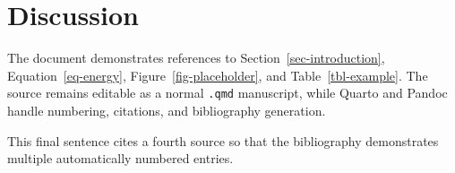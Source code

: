 \documentclass[
  number,
  preprint]{elsarticle}
\begin{document}
\section{Discussion}\label{sec-discussion}

The document demonstrates references to Section~\ref{sec-introduction},
Equation~\ref{eq-energy}, Figure~\ref{fig-placeholder}, and
Table~\ref{tbl-example}. The source remains editable as a normal
\texttt{.qmd} manuscript, while Quarto and Pandoc handle numbering,
citations, and bibliography generation.

This final sentence cites a fourth source \citep{lamport1994} so that
the bibliography demonstrates multiple automatically numbered entries.


\renewcommand\refname{References}

\end{document}
